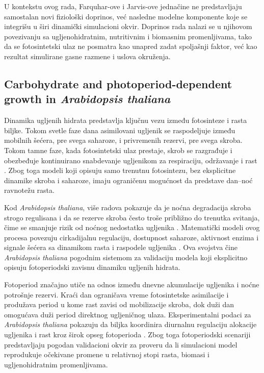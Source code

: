 \documentclass[a4paper,fleqn]{cas-dc}
\begin{document}
U kontekstu ovog rada, Farquhar-ove i Jarvis-ove jednačine ne predstavljaju samostalan novi fiziološki doprinos, već nasledne modelne komponente koje se integrišu u širi dinamički simulacioni okvir. Doprinos rada nalazi se u njihovom povezivanju sa ugljenohidratnim, nutritivnim i biomasnim promenljivama, tako da se fotosintetski ulaz ne posmatra kao unapred zadat spoljašnji faktor, već kao rezultat simulirane gasne razmene i uslova okruženja.

\subsection{Carbohydrate and photoperiod-dependent growth in \textit{Arabidopsis thaliana}}

Dinamika ugljenih hidrata predstavlja ključnu vezu između fotosinteze i rasta biljke. Tokom svetle faze dana asimilovani ugljenik se raspodeljuje između mobilnih šećera, pre svega saharoze, i privremenih rezervi, pre svega skroba. Tokom tamne faze, kada fotosintetski ulaz prestaje, skrob se razgrađuje i obezbeđuje kontinuirano snabdevanje ugljenikom za respiraciju, održavanje i rast \cite{Stitt2012,Smith2007}. Zbog toga modeli koji opisuju samo trenutnu fotosintezu, bez eksplicitne dinamike skroba i saharoze, imaju ograničenu mogućnost da predstave dan--noć ravnotežu rasta.

Kod \textit{Arabidopsis thaliana}, više radova pokazuje da je noćna degradacija skroba strogo regulisana i da se rezerve skroba često troše približno do trenutka svitanja, čime se smanjuje rizik od noćnog nedostatka ugljenika \cite{Scialdone2013,Stitt2012,Webb2015}. Matematički modeli ovog procesa povezuju cirkadijalnu regulaciju, dostupnost saharoze, aktivnost enzima i signale šećera sa dinamikom rasta i raspodele ugljenika \cite{Feugier2013,Seki2017}. Ova svojstva čine \textit{Arabidopsis thaliana} pogodnim sistemom za validaciju modela koji eksplicitno opisuju fotoperiodski zavisnu dinamiku ugljenih hidrata.

Fotoperiod značajno utiče na odnos između dnevne akumulacije ugljenika i noćne potrošnje rezervi. Kraći dan ograničava vreme fotosintetske asimilacije i produžava period u kome rast zavisi od mobilizacije skroba, dok duži dan omogućava duži period direktnog ugljeničnog ulaza. Eksperimentalni podaci za \textit{Arabidopsis thaliana} pokazuju da biljka koordinira diurnalnu regulaciju alokacije ugljenika i rast kroz širok opseg fotoperioda \cite{Sulpice2014}. Zbog toga fotoperiodski scenariji predstavljaju pogodan validacioni okvir za proveru da li simulacioni model reprodukuje očekivane promene u relativnoj stopi rasta, biomasi i ugljenohidratnim promenljivama.
\end{document}

